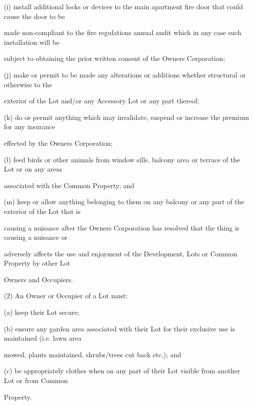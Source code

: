\documentclass{article}
\begin{document}
{\fontsize{9.962}{1}(i) install additional locks or devices to the main apartment fire door that could cause the door to be }

{\fontsize{10.02}{1}made non-compliant to the fire regulations annual audit which in any case such installation will be }

{\fontsize{10.02}{1}subject to obtaining the prior written consent of the Owners Corporation; }

{\fontsize{9.962}{1}(j) make or permit to be made any alterations or additions whether structural or otherwise to the }

{\fontsize{10.02}{1}exterior of the Lot and/or any Accessory Lot or any part thereof; }

{\fontsize{9.962}{1}(k) do or permit anything which may invalidate, suspend or increase the premium for any insurance }

{\fontsize{10.02}{1}effected by the Owners Corporation; }

\newpage

{\fontsize{9.962}{1}(l) feed birds or other animals from window sills, balcony area or terrace of the Lot or on any areas }

{\fontsize{10.02}{1}associated with the Common Property; and }

{\fontsize{9.962}{1}(m) keep or allow anything belonging to them on any balcony or any part of the exterior of the Lot that is }

{\fontsize{10.02}{1}causing a nuisance after the Owners Corporation has resolved that the thing is causing a nuisance or }

{\fontsize{10.02}{1}adversely affects the use and enjoyment of the Development, Lots or Common Property by other Lot }

{\fontsize{10.02}{1}Owners and Occupiers. }

{\fontsize{9.962}{1}(2) An Owner or Occupier of a Lot must: }

{\fontsize{9.962}{1}(a) keep their Lot secure; }

{\fontsize{9.962}{1}(b) ensure any garden area associated with their Lot for their exclusive use is maintained (i.e. lawn area }

{\fontsize{10.02}{1}mowed, plants maintained, shrubs/trees cut back etc.); and }

{\fontsize{9.962}{1}(c) be appropriately clothes when on any part of their Lot visible from another Lot or from Common }

{\fontsize{10.02}{1}Property. }
\end{document}
